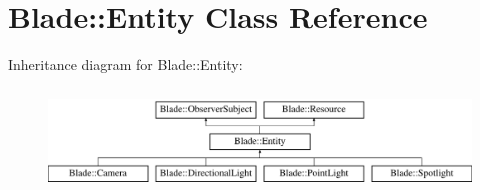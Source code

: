 \hypertarget{class_blade_1_1_entity}{}\section{Blade\+:\+:Entity Class Reference}
\label{class_blade_1_1_entity}
Inheritance diagram for Blade\+:\+:Entity\+:\begin{figure}[H]
\begin{center}
\leavevmode
\includegraphics[height=2.727273cm]{class_blade_1_1_entity}
\end{center}
\end{figure}
